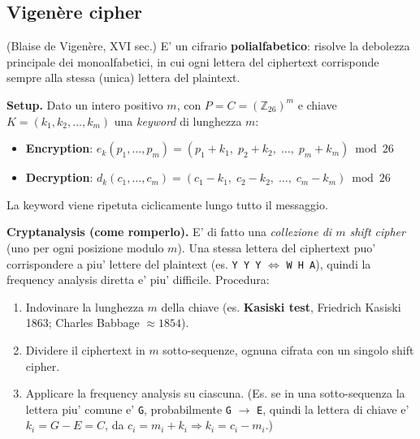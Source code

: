 
\subsection{Vigen\`ere cipher}
(Blaise de Vigen\`ere, XVI sec.) E' un cifrario \textbf{polialfabetico}: risolve la debolezza principale dei monoalfabetici, in cui ogni lettera del ciphertext corrisponde sempre alla stessa (unica) lettera del plaintext.

\textbf{Setup.} Dato un intero positivo $m$, con $P = C = (\mathbb{Z}_{26})^m$ e chiave $K = (k_1, k_2, \dots, k_m)$ una \textit{keyword} di lunghezza $m$:
\begin{itemize}
  \item \textbf{Encryption}: $e_k(p_1, \dots, p_m) = (p_1 + k_1, \; p_2 + k_2, \; \dots, \; p_m + k_m) \bmod 26$
  \item \textbf{Decryption}: $d_k(c_1, \dots, c_m) = (c_1 - k_1, \; c_2 - k_2, \; \dots, \; c_m - k_m) \bmod 26$
\end{itemize}
La keyword viene ripetuta ciclicamente lungo tutto il messaggio.


\textbf{Cryptanalysis (come romperlo).} E' di fatto una \textit{collezione di $m$ shift cipher} (uno per ogni posizione modulo $m$). Una stessa lettera del ciphertext puo' corrispondere a piu' lettere del plaintext (es. \texttt{Y Y Y} $\Leftrightarrow$ \texttt{W H A}), quindi la frequency analysis diretta e' piu' difficile. Procedura:
\begin{enumerate}
  \item Indovinare la lunghezza $m$ della chiave (es. \textbf{Kasiski test}, Friedrich Kasiski 1863; Charles Babbage $\approx 1854$).
  \item Dividere il ciphertext in $m$ sotto-sequenze, ognuna cifrata con un singolo shift cipher.
  \item Applicare la frequency analysis su ciascuna. (Es. se in una sotto-sequenza la lettera piu' comune e' \texttt{G}, probabilmente \texttt{G} $\to$ \texttt{E}, quindi la lettera di chiave e' $k_i = G - E = C$, da $c_i = m_i + k_i \Rightarrow k_i = c_i - m_i$.)
\end{enumerate}

